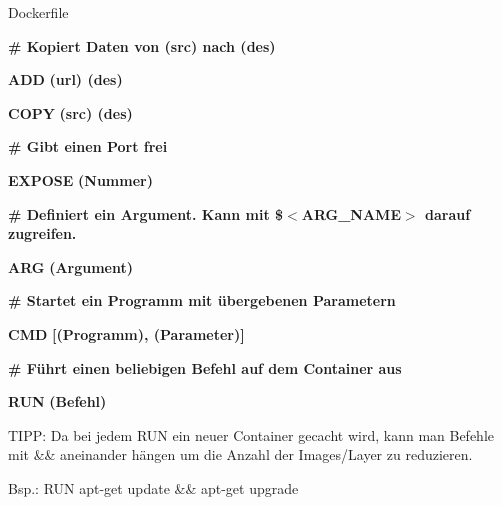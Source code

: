 \documentclass[final]{beamer}
\newlength{\onecolwid}
\begin{document}
\begin{frame}
\begin{columns}[t]
\begin{column}{\onecolwid}
\begin{block}{Dockerfile}
\vspace{1cm}
\par \textcolor{docker-green}{\textbf{\# Kopiert Daten von (src) nach (des)}}
\par \textcolor{docker-pu}{\textbf{ADD}} \textcolor{docker-red}{\textbf{(url) (des)}}
\par \textcolor{docker-pu}{\textbf{COPY}} \textcolor{docker-red}{\textbf{(src) (des)}}

\vspace{1cm}
\par \textcolor{docker-green}{\textbf{\# Gibt einen Port frei}}
\par \textcolor{docker-pu}{\textbf{EXPOSE}} \textcolor{docker-red}{\textbf{(Nummer)}}

\vspace{1cm}
\par \textcolor{docker-green}{\textbf{\# Definiert ein Argument. Kann mit \$$<$ARG\_NAME$>$ darauf zugreifen.}}
\par \textcolor{docker-pu}{\textbf{ARG}} \textcolor{docker-red}{\textbf{(Argument)}}

\vspace{1cm}
\par \textcolor{docker-green}{\textbf{\# Startet ein Programm mit übergebenen Parametern}}
\par \textcolor{docker-pu}{\textbf{CMD}} \textcolor{docker-red}{\textbf{[(Programm), (Parameter)]}}

\vspace{1cm}
\par \textcolor{docker-green}{\textbf{\# Führt einen beliebigen Befehl auf dem Container aus}}
\par \textcolor{docker-pu}{\textbf{RUN}} \textcolor{docker-red}{\textbf{(Befehl)}}

\begin{small}
\vspace{1cm}
\par TIPP: Da bei jedem RUN ein neuer Container gecacht wird, kann man Befehle mit \&\& aneinander hängen um die Anzahl der Images/Layer zu reduzieren.

\vspace{1cm}
\par Bsp.: RUN apt-get update \&\& apt-get upgrade
	
\end{small}



\vspace{3cm}


\end{block}
\end{column}
\end{columns}
\end{frame}
\end{document}

